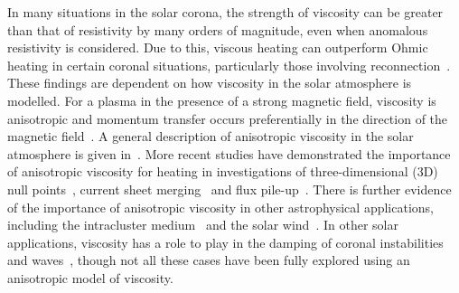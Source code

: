 In many situations in the solar corona, the strength of viscosity
can be greater than that of resistivity by many orders of
magnitude, even when anomalous resistivity is considered. Due to this,
viscous heating can outperform Ohmic heating in certain coronal
situations, particularly those involving
reconnection~\cite{browningMechanismsSolarCoronal1991,
  craigViscousDissipation3D2013,
  armstrongViscoResistiveDissipation2013,
  hollwegViscosityChewGoldbergerLowEquations1986a}. These findings are
dependent on how viscosity in the solar atmosphere is modelled. For a
plasma in the presence of a strong magnetic field, viscosity is
anisotropic and momentum transfer occurs preferentially in the
direction of the magnetic
field~\cite{braginskiiTransportProcessesPlasma1965}. A general
description of anisotropic viscosity in the solar atmosphere is given
in~\cite{hollwegViscosityMagnetizedPlasma1985,
  hollwegViscosityChewGoldbergerLowEquations1986a}. More recent
studies have demonstrated the importance of anisotropic viscosity for
heating in investigations of three-dimensional (3D) null
points~\cite{craigViscousDissipation3D2013}, current sheet
merging~\cite{armstrongViscoResistiveDissipation2013} and flux
pile-up~\cite{litvinenkoViscousEnergyDissipation2005}. There is
further evidence of the importance of anisotropic viscosity in other
astrophysical applications, including the intracluster medium~\cite{zuhoneEffectAnisotropicViscosity2014, parrishEffectsAnisotropicViscosity2012a} and the solar wind~\cite{baleMagneticFluctuationPower2009}. In other solar applications, viscosity has a role to play in the damping of coronal instabilities~\cite{howsonEffectsResistivityViscosity2017} and waves~\cite{vranjesViscosityEffectsWaves2014, erdelyiResonantAbsorptionAlfven1995a, rudermanSlowSurfaceWave2000a}, though not all these cases have been fully explored using an anisotropic model of viscosity.

